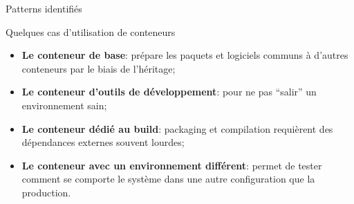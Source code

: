 \begin{frame}{Patterns identifiés}
    \begin{block}{Quelques cas d'utilisation de conteneurs}
        \begin{itemize}
            \item \textbf{Le conteneur de base}: prépare les paquets et logiciels communs à d'autres conteneurs par le biais de l'héritage;
            \item \textbf{Le conteneur d'outils de développement}: pour ne pas \enquote{salir} un environnement sain;
            \item \textbf{Le conteneur dédié au build}: packaging et compilation requièrent des dépendances externes souvent lourdes;
            \item \textbf{Le conteneur avec un environnement différent}: permet de tester comment se comporte le système dans une autre configuration que la production.
        \end{itemize}
    \end{block}
\end{frame}
